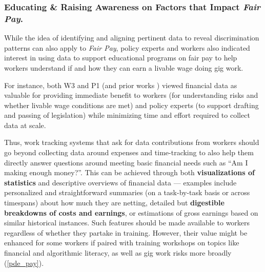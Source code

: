 \subsubsection{\textbf{{Educating \& Raising Awareness on Factors that Impact \textit{Fair Pay}}.}}
{While the idea of identifying and aligning pertinent data to reveal discrimination patterns can also apply to \textit{Fair Pay}, policy experts and workers also indicated interest in using data to support educational programs on fair pay to help workers understand if and how they can earn a livable wage doing gig work. 

For instance, both W3 and P1 (and prior works \cite{codesign, finlit}) viewed financial data as valuable for providing immediate benefit to workers (for understanding risks and whether livable wage conditions are met) and policy experts (to support drafting and passing of legislation) while minimizing time and effort required to collect data at scale.

Thus, work tracking systems that ask for data contributions from workers should go beyond collecting data around expenses and time-tracking to also help them directly answer questions around meeting basic financial needs such as ``Am I making enough money?''. This can be achieved through both \textbf{visualizations of statistics} and descriptive overviews of financial data --- examples include personalized and straightforward summaries (on a task-by-task basis or across timespans) about how much they are netting, detailed but \textbf{digestible breakdowns of costs and earnings}, or estimations of gross earnings based on similar historical instances.
Such features should be made available to workers regardless of whether they partake in training. However, their value might be enhanced for some workers if paired with training workshops on topics like financial and algorithmic literacy, as well as gig work risks more broadly (\ref{pde_pay}).
%

}
